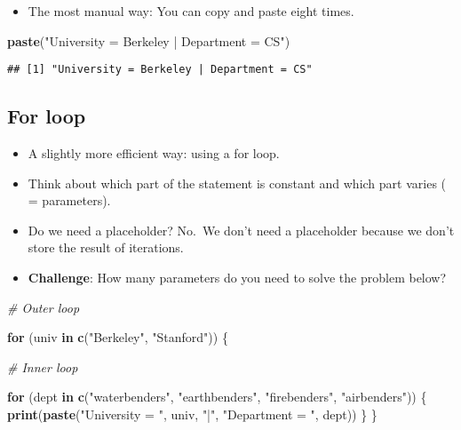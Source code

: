 \documentclass[
]{book}
\newenvironment{Shaded}{\begin{snugshade}}{\end{snugshade}}
\newcommand{\CommentTok}[1]{\textcolor[rgb]{0.56,0.35,0.01}{\textit{#1}}}
\newcommand{\ControlFlowTok}[1]{\textcolor[rgb]{0.13,0.29,0.53}{\textbf{#1}}}
\newcommand{\KeywordTok}[1]{\textcolor[rgb]{0.13,0.29,0.53}{\textbf{#1}}}
\newcommand{\NormalTok}[1]{#1}
\newcommand{\StringTok}[1]{\textcolor[rgb]{0.31,0.60,0.02}{#1}}
\providecommand{\tightlist}{%
  \setlength{\itemsep}{0pt}\setlength{\parskip}{0pt}}
\begin{document}
\begin{itemize}
\tightlist
\item
  The most manual way: You can copy and paste eight times.
\end{itemize}

\begin{Shaded}
\begin{Highlighting}[]
\KeywordTok{paste}\NormalTok{(}\StringTok{"University = Berkeley | Department = CS"}\NormalTok{)}
\end{Highlighting}
\end{Shaded}

\begin{verbatim}
## [1] "University = Berkeley | Department = CS"
\end{verbatim}

\hypertarget{for-loop-1}{%
\subsection{For loop}\label{for-loop-1}}

\begin{itemize}
\item
  A slightly more efficient way: using a for loop.
\item
  Think about which part of the statement is constant and which part varies ( = parameters).
\item
  Do we need a placeholder? No.~We don't need a placeholder because we don't store the result of iterations.
\item
  \textbf{Challenge}: How many parameters do you need to solve the problem below?
\end{itemize}

\begin{Shaded}
\begin{Highlighting}[]
\CommentTok{\# Outer loop}

\ControlFlowTok{for}\NormalTok{ (univ }\ControlFlowTok{in} \KeywordTok{c}\NormalTok{(}\StringTok{"Berkeley"}\NormalTok{, }\StringTok{"Stanford"}\NormalTok{)) \{}

  \CommentTok{\# Inner loop}

  \ControlFlowTok{for}\NormalTok{ (dept }\ControlFlowTok{in} \KeywordTok{c}\NormalTok{(}\StringTok{"waterbenders"}\NormalTok{, }\StringTok{"earthbenders"}\NormalTok{, }\StringTok{"firebenders"}\NormalTok{, }\StringTok{"airbenders"}\NormalTok{)) \{}
    \KeywordTok{print}\NormalTok{(}\KeywordTok{paste}\NormalTok{(}\StringTok{"University = "}\NormalTok{, univ, }\StringTok{"|"}\NormalTok{, }\StringTok{"Department = "}\NormalTok{, dept))}
\NormalTok{  \}}
\NormalTok{\}}
\end{Highlighting}
\end{Shaded}
\end{document}
